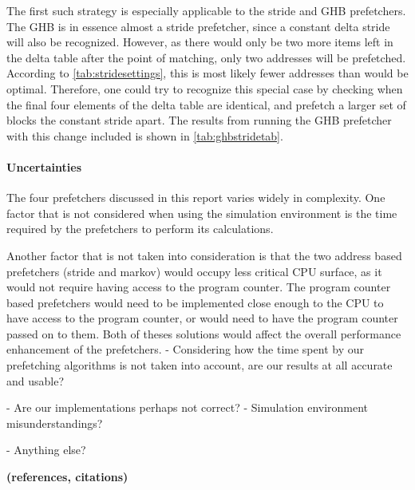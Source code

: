 The first such strategy is especially applicable to the stride and GHB
prefetchers. The GHB is in essence almost a stride prefetcher, since a
constant delta stride will also be recognized. However, as there would
only be two more items left in the delta table after the point of
matching, only two addresses will be prefetched. According to
\autoref{tab:stridesettings}, this is most likely fewer addresses than
would be optimal. Therefore, one could try to recognize this special
case by checking when the final four elements of the delta table are
identical, and prefetch a larger set of blocks the constant stride
apart. The results from running the GHB prefetcher with this change
included is shown in \autoref{tab:ghbstridetab}.

\paragraph{Uncertainties}
\label{"waiting for reftex-label call..."}
The four prefetchers discussed in this report varies widely in complexity. One factor that is not considered when using the simulation environment is the time required by the prefetchers to perform its calculations. 

Another factor that is not taken into consideration is that the two address based prefetchers (stride and markov) would occupy less critical CPU surface, as it would not require having access to the program counter. The program counter based prefetchers would need to be implemented close enough to the CPU to have access to the program counter, or would need to have the program counter passed on to them. Both of theses solutions would affect the overall performance enhancement of the prefetchers. 
- Considering how the time spent by our prefetching algorithms is not
taken into account, are our results at all accurate and usable?

- Are our implementations perhaps not correct?
- Simulation environment misunderstandings?

- Anything else?

{\bf (references, citations)}
